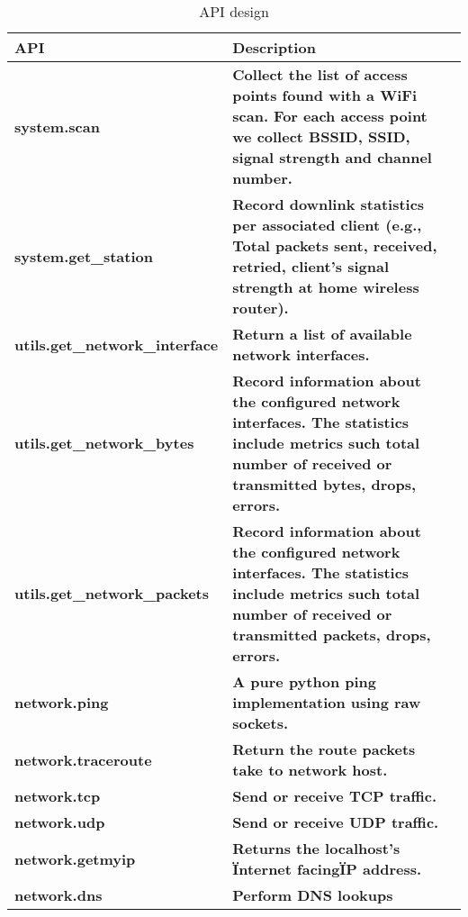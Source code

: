 \begin{table*} %
\scriptsize
\centering
\begin{adjustwidth}{1cm}{-1cm}
\begin{tabular}{|p{}| p{}| m{}|}
\hline
\textbf{API}    &  \textbf{Description} \\
 \hline
 {\bf system.scan} & {\bf Collect the list of access points found with a WiFi scan. For each access point we collect BSSID, SSID, signal strength and channel number.} \\
\hline
 {\bf system.get\_station} & {\bf Record downlink statistics per associated client (e.g., Total packets sent, received, retried, client's signal strength at home wireless router).} \\
\hline
 {\bf utils.get\_network\_interface} & {\bf Return a list of available network interfaces.} \\
\hline
 {\bf utils.get\_network\_bytes} & {\bf Record information about the configured network interfaces. The statistics include metrics such total number of received or transmitted bytes, drops, errors.} \\
\hline
 {\bf utils.get\_network\_packets} & {\bf Record information about the configured network interfaces. The statistics include metrics such total number of received or transmitted packets, drops, errors.} \\
\hline
 {\bf network.ping} & {\bf A pure python ping implementation using raw sockets.} \\
\hline
 {\bf network.traceroute} & {\bf Return the route packets take to network host. } \\
\hline
 {\bf network.tcp} & {\bf Send or receive TCP traffic.} \\
\hline
 {\bf network.udp} & {\bf Send or receive UDP traffic.} \\
\hline
 {\bf network.getmyip} & {\bf Returns the localhost's \"Internet facing\" IP address.} \\
\hline
 {\bf network.dns} & {\bf Perform DNS lookups} \\
\hline
\end{tabular}
\end{adjustwidth}
\caption {API design}
\label{table:api_design}
\end{table*}

